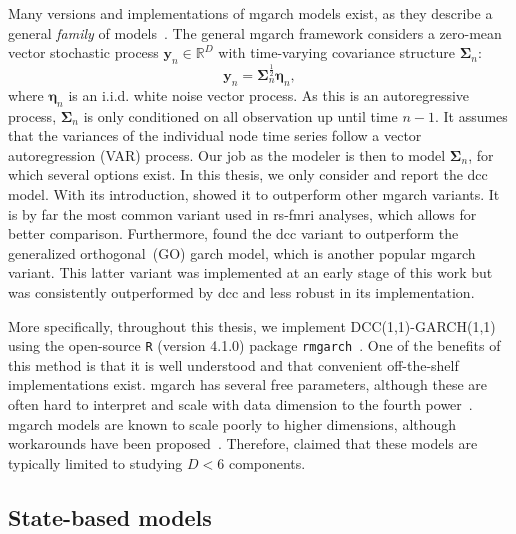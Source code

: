 Many versions and implementations of \gls{mgarch} models exist, as they describe a general \emph{family} of models~\parencite[see][for an extensive overview]{Silvennoinen2009}.
%
The general \gls{mgarch} framework considers a zero-mean vector stochastic process $\mathbf{y}_n \in \mathbb{R}^D$ with time-varying covariance structure $\mathbf{\Sigma}_n$:
\begin{equation}
  \mathbf{y}_n = \mathbf{\Sigma}_n^{\frac12} \mathbf{\eta}_n,
\end{equation}
where $\mathbf{\eta}_n$ is an i.i.d. white noise vector process.
As this is an autoregressive process, $\mathbf{\Sigma}_n$ is only conditioned on all observation up until time $n - 1$.
It assumes that the variances of the individual node time series follow a vector autoregression (VAR) process.
%
Our job as the modeler is then to model $\mathbf{\Sigma}_n$, for which several options exist.
In this thesis, we only consider and report the \gls{dcc} model.
With its introduction, \textcite{Engle2002} showed it to outperform other \gls{mgarch} variants.
It is by far the most common variant used in \gls{rs-fmri} analyses, which allows for better comparison.
Furthermore, \textcite{Heaukulani2019} found the \gls{dcc} variant to outperform the generalized orthogonal~(GO) \gls{garch} model, which is another popular \gls{mgarch} variant.
This latter variant was implemented at an early stage of this work but was consistently outperformed by \gls{dcc} and less robust in its implementation.

More specifically, throughout this thesis, we implement DCC(1,1)-GARCH(1,1) using the open-source \texttt{R} (version 4.1.0) package \texttt{rmgarch}~\parencite{Galanos2022}.
One of the benefits of this method is that it is well understood and that convenient off-the-shelf implementations exist.
\Gls{mgarch} has several free parameters, although these are often hard to interpret and scale with data dimension to the fourth power~\parencite{Silvennoinen2009}.
\Gls{mgarch} models are known to scale poorly to higher dimensions, although workarounds have been proposed~\parencite[see e.g.][]{Nakajima2017}.
Therefore, \textcite{Gourieroux2009} claimed that these models are typically limited to studying $D < 6$ components.

\subsection{State-based models}\label{subsec:state-based-models}

